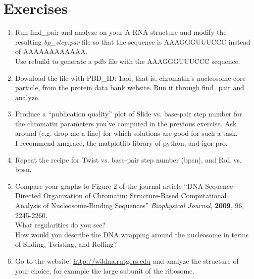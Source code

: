 \section{Exercises}
\begin{enumerate}
\item{Run   \textrm{find\_pair}  and  \textrm{analyze}   on  your  A-RNA
structure and modify the  resulting \textit{bp\_step.par} file so that
the sequence is AAAGGGUUUCCC instead of AAAAAAAAAAAA.\\
Use rebuild to generate a pdb file with the AAAGGGUUUCCC sequence.}
\item{Download the file with PBD\_ID: 1aoi, that is, chromatin's
nucleosome core particle,  from the protein data bank  website. Run it
through \textrm{find\_pair} and \textrm{analyze}.}
\item{Produce a  ``publication quality''  plot of Slide  vs. base-pair
    step number  for the chromatin  parameters you've computed  in the
    previous exercise.  Ask around (e.g.  drop me a line) for which solutions
    are  good  for  such  a  task.\\ I  recommend  \textrm{xmgrace},  the
   \textrm{matplotlib} library of \textrm{python}, and  \textrm{igor-pro}.}
\item{Repeat the recipe for Twist vs. base-pair step number (bpsn), and Roll
    vs. bpsn.}
\item{Compare your  graphs to  Figure 2 of  the journal  article ``DNA
    Sequence-Directed   Organization  of   Chromatin:  Structure-Based
    Computational    Analysis   of    Nucleosome-Binding   Sequences''
    \textit{Biophysical Journal}, \textbf{2009}, 96, 2245-2260.\\  What
    regularities do  you see?\\  How would you  describe the  DNA wrapping
    around the nucleosome in terms of Sliding, Twisting, and Rolling?}
\item{Go  to the  website: \url{http://w3dna.rutgers.edu}  and analyze
    the structure of your choice, for example the large subunit of the
  ribosome.}
\end{enumerate}








